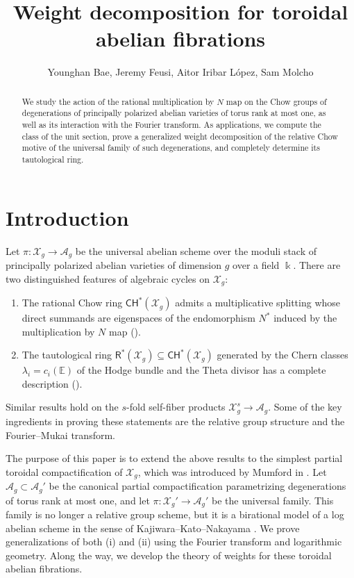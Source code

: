 \documentclass[11pt]{article}
\title{Weight decomposition for toroidal abelian fibrations}
\author{Younghan Bae, Jeremy Feusi, Aitor Iribar L\'opez, Sam Molcho}
\date{}
\def\CH{\mathsf{CH}}
\def\R{\mathsf{R}}
\def\A{\mathcal{A}}
\def\X{\mathcal{X}}
\def\EE{\mathbb{E}}
\theoremstyle{definition}
\begin{document}
\maketitle

\begin{abstract}
     We study the action of the rational multiplication by $N$ map on the Chow groups of degenerations of principally polarized abelian varieties of torus rank at most one, as well as its interaction with the Fourier transform. As applications, we compute the class of the unit section, prove a generalized weight decomposition of the relative Chow motive of the universal family of such degenerations, and completely determine its tautological ring.
   \end{abstract}

\tableofcontents

\section{Introduction}

Let $\pi : \X_g \to \A_g$ be the universal abelian scheme over the moduli stack of principally polarized abelian varieties of dimension $g$ over a field $\Bbbk$. There are two distinguished features of algebraic cycles on $\X_g$:
\begin{enumerate}
\item[(i)] The rational Chow ring $\CH^*(\X_g)$ admits a multiplicative splitting whose direct summands are eigenspaces of the endomorphism $N^*$ induced by the multiplication by $N$ map (\cite{Beauville86,DM91}).

\item[(ii)] The tautological ring $\R^*(\X_g)\subseteq \CH^*(\X_g)$ generated by the Chern classes $\lambda_i = c_i(\EE)$ of the Hodge bundle and the Theta divisor has a complete description (\cite{vdG99}).
\end{enumerate}
Similar results hold on the $s$-fold self-fiber products $\X_g^s \to \A_g$. Some of the key ingredients in proving these statements are the relative group structure and the Fourier--Mukai transform.

The purpose of this paper is to extend the above results to the simplest partial toroidal compactification of $\X_g$, which was introduced by Mumford in \cite{mumford_kodaira}. Let $\A_g\subset \A_g'$ be the canonical partial compactification parametrizing degenerations of torus rank at most one, and let $\pi : \X_g' \to \A_g'$ be the universal family. This family is no longer a relative group scheme, but it is a birational model of a log abelian scheme in the sense of Kajiwara--Kato--Nakayama \cite{KKN1, KKN2}. We prove generalizations of both (i) and (ii) using the Fourier transform and logarithmic geometry. Along the way, we develop the theory of weights for these toroidal abelian fibrations.
\end{document}
